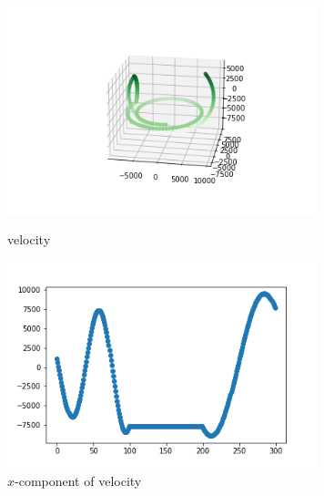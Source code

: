 \documentclass[12pt]{article}
\begin{document}
	\begin{figure}[H]
		\begin{multicols}{2}
			\includegraphics[width=\linewidth, height=6cm]{vs2.png} \caption{velocity} \label{vs2} \par
			\includegraphics[width=\linewidth, height=6cm]{vsx2.png} \caption{$x$-component of velocity} \label{vsx2} \par
		\end{multicols}
	\end{figure}
\end{document}
